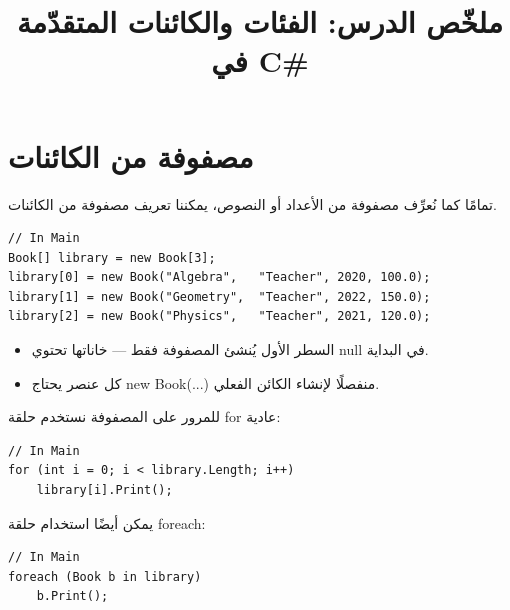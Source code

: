 \documentclass[14pt]{extarticle}
\title{ملخّص الدرس: الفئات والكائنات المتقدّمة في \textenglish{C\#}}
\begin{document}
\maketitle
\thispagestyle{fancy}

\section{مصفوفة من الكائنات}

تمامًا كما نُعرِّف مصفوفة من الأعداد أو النصوص، يمكننا تعريف مصفوفة من الكائنات.

\begin{boxExample}
\begin{english}
\begin{verbatim}
// In Main
Book[] library = new Book[3];
library[0] = new Book("Algebra",   "Teacher", 2020, 100.0);
library[1] = new Book("Geometry",  "Teacher", 2022, 150.0);
library[2] = new Book("Physics",   "Teacher", 2021, 120.0);
\end{verbatim}
\end{english}
\end{boxExample}

\begin{itemize}[itemsep=1pt]
    \item السطر الأول يُنشئ المصفوفة فقط — خاناتها تحتوي \textenglish{null} في البداية.
    \item كل عنصر يحتاج \textenglish{new Book(...)} منفصلًا لإنشاء الكائن الفعلي.
\end{itemize}

للمرور على المصفوفة نستخدم حلقة \textenglish{for} عادية:

\begin{boxExample}
\begin{english}
\begin{verbatim}
// In Main
for (int i = 0; i < library.Length; i++)
    library[i].Print();
\end{verbatim}
\end{english}
\end{boxExample}

يمكن أيضًا استخدام حلقة \textenglish{foreach}:

\begin{boxExample}
\begin{english}
\begin{verbatim}
// In Main
foreach (Book b in library)
    b.Print();
\end{verbatim}
\end{english}
\end{boxExample}
\end{document}
